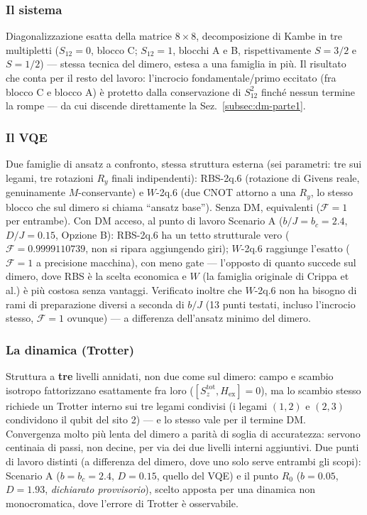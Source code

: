 \documentclass[11pt,a4paper]{article}
\begin{document}
\subsubsection{Il sistema}

Diagonalizzazione esatta della matrice $8\times8$, decomposizione di
Kambe in tre multipletti ($S_{12}=0$, blocco C; $S_{12}=1$, blocchi A e
B, rispettivamente $S=3/2$ e $S=1/2$) --- stessa tecnica del dimero,
estesa a una famiglia in più. Il risultato che conta per il resto del
lavoro: l'incrocio fondamentale/primo eccitato (fra blocco C e blocco A)
è protetto dalla conservazione di $S_{12}^2$ finché nessun termine la
rompe --- da cui discende direttamente la Sez.~\ref{subsec:dm-parte1}.

\subsubsection{Il VQE}

Due famiglie di ansatz a confronto, stessa struttura esterna (sei
parametri: tre sui legami, tre rotazioni $R_y$ finali indipendenti):
RBS-2q.6 (rotazione di Givens reale, genuinamente $M$-conservante) e
$W$-2q.6 (due CNOT attorno a una $R_y$, lo stesso blocco che sul dimero
si chiama ``ansatz base''). Senza DM, equivalenti ($\mathcal F=1$ per
entrambe). Con DM acceso, al punto di lavoro Scenario A ($b/J=b_c=2.4$,
$D/J=0.15$, Opzione B): RBS-2q.6 ha un tetto strutturale vero
($\mathcal F=0.9999110739$, non si ripara aggiungendo giri); $W$-2q.6
raggiunge l'esatto ($\mathcal F=1$ a precisione macchina), con meno gate
--- l'opposto di quanto succede sul dimero, dove RBS è la scelta
economica e $W$ (la famiglia originale di Crippa et al.) è più costosa
senza vantaggi. Verificato inoltre che $W$-2q.6 non ha bisogno di rami
di preparazione diversi a seconda di $b/J$ (13 punti testati, incluso
l'incrocio stesso, $\mathcal F=1$ ovunque) --- a differenza dell'ansatz
minimo del dimero.

\subsubsection{La dinamica (Trotter)}

Struttura a \textbf{tre} livelli annidati, non due come sul dimero:
campo e scambio isotropo fattorizzano esattamente fra loro ($[S_z^\text{tot},H_\text{ex}]=0$),
ma lo scambio stesso richiede un Trotter interno sui tre legami
condivisi (i legami $(1,2)$ e $(2,3)$ condividono il qubit del sito 2) ---
e lo stesso vale per il termine DM. Convergenza molto più lenta del
dimero a parità di soglia di accuratezza: servono centinaia di passi,
non decine, per via dei due livelli interni aggiuntivi. Due punti di
lavoro distinti (a differenza del dimero, dove uno solo serve entrambi
gli scopi): Scenario A ($b=b_c=2.4$, $D=0.15$, quello del VQE) e il
punto $R_0$ ($b=0.05$, $D=1.93$, \emph{dichiarato provvisorio}), scelto
apposta per una dinamica non monocromatica, dove l'errore di Trotter è
osservabile.
\end{document}
